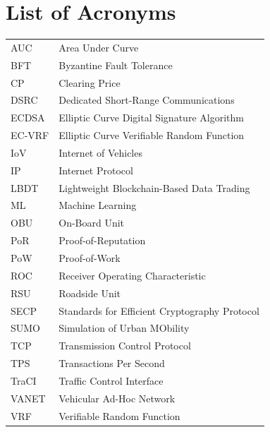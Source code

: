 \chapter*{List of Acronyms}

\begin{longtable}{ll}

AUC & Area Under Curve \\

BFT & Byzantine Fault Tolerance \\

CP & Clearing Price \\

DSRC & Dedicated Short-Range Communications \\

ECDSA & Elliptic Curve Digital Signature Algorithm \\
EC-VRF & Elliptic Curve Verifiable Random Function \\

IoV & Internet of Vehicles \\
IP & Internet Protocol \\

LBDT & Lightweight Blockchain-Based Data Trading \\

ML & Machine Learning \\

OBU & On-Board Unit \\

PoR & Proof-of-Reputation \\
PoW & Proof-of-Work \\

ROC & Receiver Operating Characteristic \\
RSU & Roadside Unit \\

SECP & Standards for Efficient Cryptography Protocol \\
SUMO & Simulation of Urban MObility \\

TCP & Transmission Control Protocol \\
TPS & Transactions Per Second \\
TraCI & Traffic Control Interface \\

VANET & Vehicular Ad-Hoc Network \\
VRF & Verifiable Random Function \\

\end{longtable}
